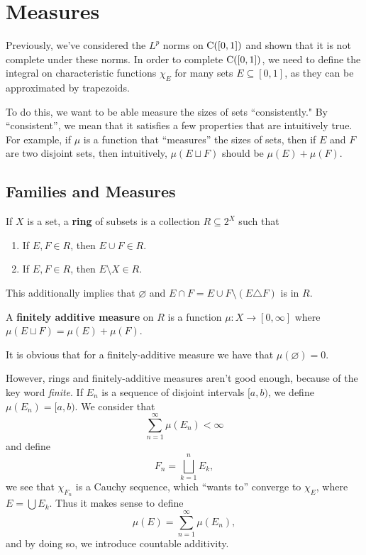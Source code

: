 \chapter{Measures}

Previously, we've considered the $L^p$ norms on $\mathrm C([0, 1])$ and shown that it is not complete under these norms. In order to complete $\mathrm C([0, 1])$, we need to define the integral on characteristic functions $\chi_E$ for many sets $E \subseteq [0, 1]$, as they can be approximated by trapezoids. 

To do this, we want to be able measure the sizes of sets ``consistently." By ``consistent'', we mean that it satisfies a few properties that are intuitively true. For example, if $\mu$ is a function that ``measures'' the sizes of sets, then if $E$ and $F$ are two disjoint sets, then intuitively, $\mu(E \sqcup F)$ should be $\mu(E) + \mu(F)$.

\section{Families and Measures}

\begin{definition}
    If $X$ is a set, a \textbf{ring} of subsets is a collection $R \subseteq 2^X$ such that \begin{enumerate}
        \item If $E, F \in R$, then $E \cup F \in R$.
        \item If $E, F \in R$, then $E \setminus X \in R$.
    \end{enumerate}
    This additionally implies that $\varnothing$ and $E \cap F = E \cup F \setminus (E \triangle F)$ is in $R$.

    A \textbf{finitely additive measure} on $R$ is a function $\mu \colon X \to [0, \infty]$ where $\mu(E \sqcup F) = \mu(E) + \mu(F)$.
\end{definition}

It is obvious that for a finitely-additive measure we have that $\mu(\varnothing) = 0$.

However, rings and finitely-additive measures aren't good enough, because of the key word \emph{finite}. If $E_n$ is a sequence of disjoint intervals $[a, b)$, we define $\mu(E_n) = [a, b)$. We consider that \[\sum_{n = 1}^\infty \mu(E_n) < \infty \] and define \[F_n = \bigsqcup_{k = 1}^n E_k,\] we see that $\chi_{F_n}$ is a Cauchy sequence, which ``wants to'' converge to $\chi_E$, where $E = \bigcup E_k$. Thus it makes sense to define \[\mu(E) = \sum_{n = 1}^\infty \mu(E_n),\] and by doing so, we introduce countable additivity.

